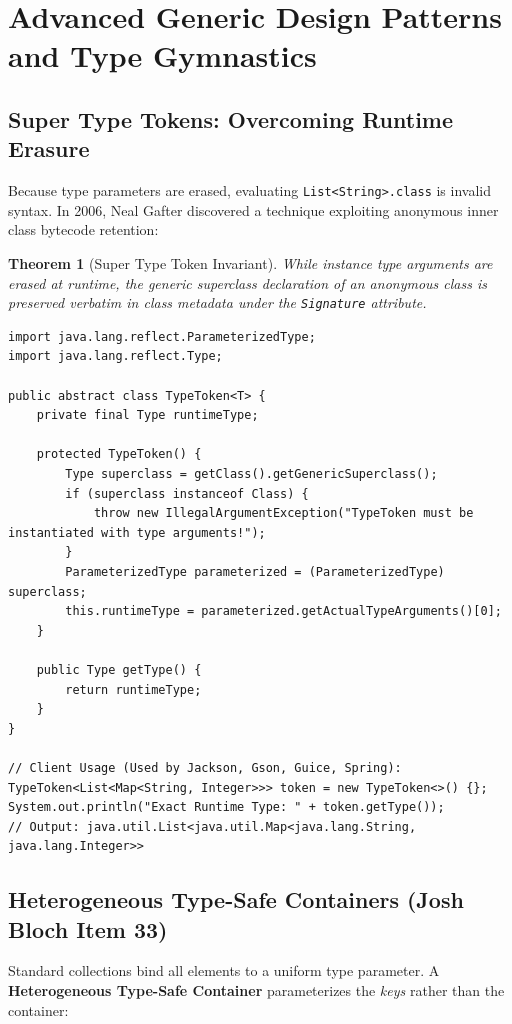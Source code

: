 \documentclass[10pt,journal,compsoc,onecolumn]{IEEEtran}
\newtheorem{theorem}{Theorem}
\begin{document}
\section{Advanced Generic Design Patterns and Type Gymnastics}
\label{sec:patterns}

\subsection{Super Type Tokens: Overcoming Runtime Erasure}
Because type parameters are erased, evaluating \texttt{List<String>.class} is invalid syntax. In 2006, Neal Gafter discovered a technique exploiting anonymous inner class bytecode retention:
\begin{theorem}[Super Type Token Invariant]
While instance type arguments are erased at runtime, the generic superclass declaration of an anonymous class is preserved verbatim in class metadata under the \texttt{Signature} attribute.
\end{theorem}

\begin{lstlisting}[caption={Neal Gafter's Super Type Token Architecture}, label={lst:type_token}]
import java.lang.reflect.ParameterizedType;
import java.lang.reflect.Type;

public abstract class TypeToken<T> {
    private final Type runtimeType;

    protected TypeToken() {
        Type superclass = getClass().getGenericSuperclass();
        if (superclass instanceof Class) {
            throw new IllegalArgumentException("TypeToken must be instantiated with type arguments!");
        }
        ParameterizedType parameterized = (ParameterizedType) superclass;
        this.runtimeType = parameterized.getActualTypeArguments()[0];
    }

    public Type getType() {
        return runtimeType;
    }
}

// Client Usage (Used by Jackson, Gson, Guice, Spring):
TypeToken<List<Map<String, Integer>>> token = new TypeToken<>() {};
System.out.println("Exact Runtime Type: " + token.getType());
// Output: java.util.List<java.util.Map<java.lang.String, java.lang.Integer>>
\end{lstlisting}

\subsection{Heterogeneous Type-Safe Containers (Josh Bloch Item 33)}
Standard collections bind all elements to a uniform type parameter. A \textbf{Heterogeneous Type-Safe Container} parameterizes the \emph{keys} rather than the container:
\end{document}
